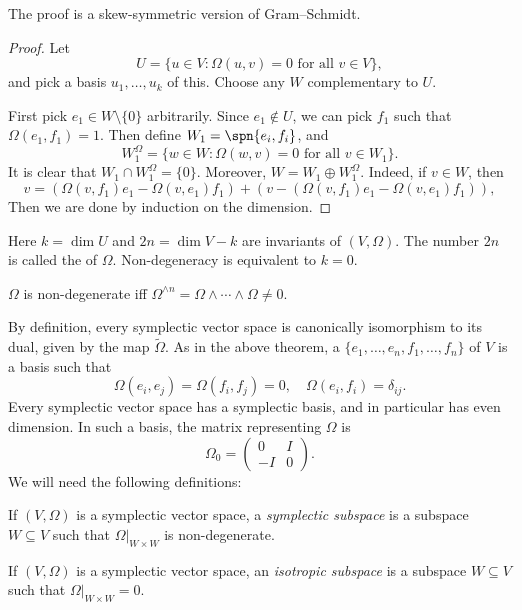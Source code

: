 \documentclass[a4paper]{article}
\begin{document}
The proof is a skew-symmetric version of Gram--Schmidt.
\begin{proof}
  Let
  \[
    U = \{u \in V : \Omega(u, v) = 0\text{ for all }v \in V\},
  \]
  and pick a basis $u_1, \ldots, u_k$ of this. Choose any $W$ complementary to $U$.

  First pick $e_1 \in W \setminus \{0\}$ arbitrarily. Since $e_1 \not \in U$, we can pick $f_1$ such that $\Omega(e_1, f_1) = 1$. Then define $W_1 = \spn\{e_i, f_i\}$, and
  \[
    W_1^\Omega = \{w \in W: \Omega(w, v) = 0\text{ for all }v \in W_1\}.
  \]
  It is clear that $W_1 \cap W_1^\Omega = \{0\}$. Moreover, $W = W_1 \oplus W_1^\Omega$. Indeed, if $v \in W$, then
  \[
    v = (\Omega(v, f_1) e_1 - \Omega(v, e_1) f_1) + (v - (\Omega(v, f_1) e_1 - \Omega(v, e_1) f_1)),
  \]
  Then we are done by induction on the dimension.
\end{proof}
Here $k = \dim U$ and $2n = \dim V - k$ are invariants of $(V, \Omega)$. The number $2n$ is called the  of $\Omega$. Non-degeneracy is equivalent to $k = 0$.

\begin{ex}
  $\Omega$ is non-degenerate iff $\Omega^{\wedge n} = \Omega \wedge \cdots \wedge \Omega \not= 0$.
\end{ex}

By definition, every symplectic vector space is canonically isomorphism to its dual, given by the map $\tilde{\Omega}$. As in the above theorem, a  $\{e_1, \ldots, e_n, f_1, \ldots, f_n\}$ of $V$ is a basis such that
\[
  \Omega(e_i, e_j) = \Omega(f_i, f_j) = 0,\quad \Omega(e_i, f_i) = \delta_{ij}.
\]
Every symplectic vector space has a symplectic basis, and in particular has even dimension. In such a basis, the matrix representing $\Omega$ is
\[
  \Omega_0 = \begin{pmatrix}
    0 & I\\
    -I & 0
  \end{pmatrix}.
\]
We will need the following definitions:
\begin{defi}
  If $(V, \Omega)$ is a symplectic vector space, a \emph{symplectic subspace} is a subspace $W \subseteq V$ such that $\Omega|_{W \times W}$ is non-degenerate.
\end{defi}

\begin{defi}
  If $(V, \Omega)$ is a symplectic vector space, an \emph{isotropic subspace} is a subspace $W \subseteq V$ such that $\Omega|_{W \times W} = 0$.
\end{defi}
\end{document}

